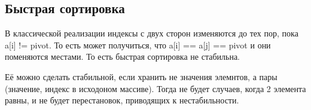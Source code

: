 \documentclass[12pt]{extarticle}
\begin{document}
\subsection*{Быстрая сортировка}
В классической реализации индексы с двух сторон изменяются до тех пор, пока a[i] != pivot. То есть может получиться, что a[i] == a[j] == pivot и они поменяются местами. То есть быстрая сортировка не стабильна.

Её можно сделать стабильной, если хранить не значения элемнтов, а пары (значение, индекс в исходоном массиве). Тогда не будет случаев, когда 2 элемента равны, и не будет перестановок, приводящих к нестабильности.
\end{document}
